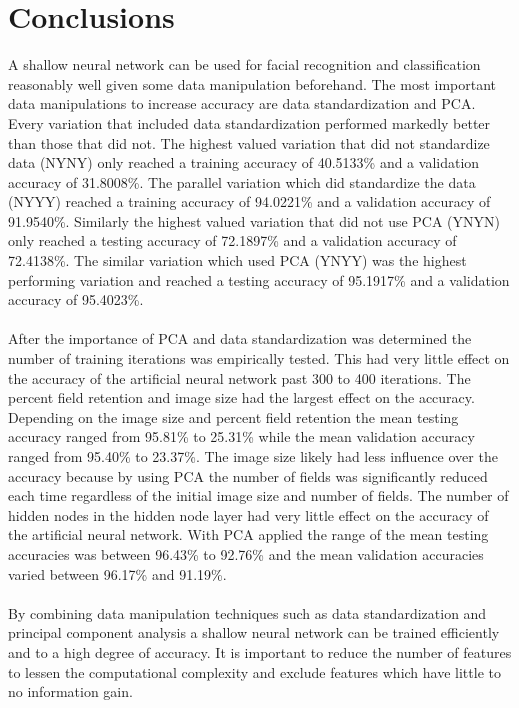 \documentclass[12pt]{article}
\begin{document}
\section{Conclusions}
A shallow neural network can be used for facial recognition and classification reasonably well given some data manipulation beforehand. The most important data manipulations to increase accuracy are data standardization and PCA. Every variation that included data standardization performed markedly better than those that did not. The highest valued variation that did not standardize data (NYNY) only reached a training accuracy of 40.5133\% and a validation accuracy of 31.8008\%. The parallel variation which did standardize the data (NYYY) reached a training accuracy of 94.0221\% and a validation accuracy of 91.9540\%. Similarly the highest valued variation that did not use PCA (YNYN) only reached a testing accuracy of 72.1897\% and a validation accuracy of 72.4138\%. The similar variation which used PCA (YNYY) was the highest performing variation and reached a testing accuracy of 95.1917\% and a validation accuracy of 95.4023\%.\\
\\
After the importance of PCA and data standardization was determined the number of training iterations was empirically tested. This had very little effect on the accuracy of the artificial neural network past 300 to 400 iterations. The percent field retention and image size had the largest effect on the accuracy. Depending on the image size and percent field retention the mean testing accuracy ranged from 95.81\% to 25.31\% while the mean validation accuracy ranged from 95.40\% to 23.37\%. The image size likely had less influence over the accuracy because by using PCA the number of fields was significantly reduced each time regardless of the initial image size and number of fields. The number of hidden nodes in the hidden node layer had very little effect on the accuracy of the artificial neural network. With PCA applied the range of the mean testing accuracies was between 96.43\% to 92.76\% and the mean validation accuracies varied between 96.17\% and 91.19\%.\\
\\
By combining data manipulation techniques such as data standardization and principal component analysis a shallow neural network can be trained efficiently and to a high degree of accuracy. It is important to reduce the number of features to lessen the computational complexity and exclude features which have little to no information gain.\\
\end{document}

